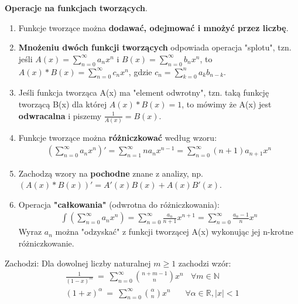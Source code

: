 \documentclass[main.tex]{subfiles}
\begin{document}
    \textbf{Operacje na funkcjach tworzących}.
    \begin{enumerate}
        \item Funkcje tworzące można \textbf{dodawać, odejmować i mnożyć przez liczbę}.
        \item \textbf{Mnożeniu dwóch funkcji tworzących} odpowiada operacja "splotu", tzn. jeśli
        $A(x) =  \sum_{n=0}^{\infty} a_n x^n$ i $B(x) = \sum_{n=0}^{\infty} b_n x^n$, to
        $A(x) * B(x) = \sum_{n=0}^{\infty} c_n x^n$, gdzie $c_n = \sum_{k=0}^n a_k b_{n-k}$.
        \item Jeśli funkcja tworząca A(x) ma "element odwrotny", tzn. taką funkcję tworzącą B(x) dla której
        $A(x) * B(x) = 1$, to mówimy że A(x) jest \textbf{odwracalna} i piszemy $\frac{1}{A(x)} = B(x)$.
        \item Funkcje tworzące można \textbf{różniczkować} według wzoru:
        \begin{align*}
            (\sum_{n=0}^{\infty} a_n x^n)' = \sum_{n=1}^{\infty} n a_n x^{n-1} = \sum_{n=0}^{\infty} (n+1) a_{n+1} x^n
        \end{align*}
        \item Zachodzą wzory na \textbf{pochodne} znane z analizy, np. $(A(x) * B(x))' = A'(x)B(x) + A(x)B'(x)$.
        \item Operacja \textbf{"całkowania"} (odwrotna do różniczkowania):
        \begin{align*}
            \int (\sum_{n=0}^{\infty} a_n x^n) = \sum_{n=0}^{\infty} \frac{a_n}{n+1} x^{n+1} = \sum_{n=0}^{\infty} \frac{a_n - 1}{n} x^n
        \end{align*}
        Wyraz $a_n$ można "odzyskać" z funkcji tworzącej A(x) wykonując jej n-krotne różniczkowanie.
    \end{enumerate}

    \begin{theorem}
        Zachodzi:
        Dla dowolnej liczby naturalnej $m \geq 1$ zachodzi wzór:
        \begin{gather*}
            \frac{1}{(1-x)^m} ~ = ~ \sum_{n=0}^{\infty} \binom{n+m-1}{n} x^n ~~~~ \forall m \in \mathbb{N}\\
            (1+x)^{\alpha} ~ = ~ \sum_{n=0}^{\infty} \binom{\alpha}{n} x^n ~~~~~~~~ \forall \alpha \in \mathbb{R}, |x| < 1
        \end{gather*}
    \end{theorem}
\end{document}
